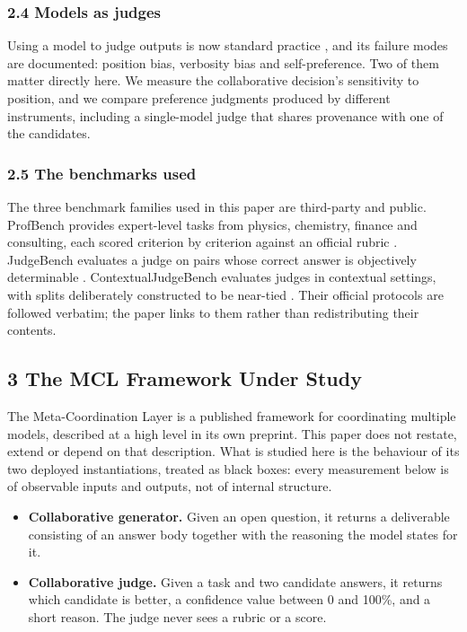 \documentclass[
]{article}
\providecommand{\tightlist}{%
  \setlength{\itemsep}{0pt}\setlength{\parskip}{0pt}}
\begin{document}
\subsubsection{2.4 Models as judges}\label{llm-judge}

Using a model to judge outputs is now standard practice \cite{zheng2023judging}, and its
failure modes are documented: position bias, verbosity bias and self-preference. Two of
them matter directly here. We measure the collaborative decision's sensitivity to position,
and we compare preference judgments produced by different instruments, including a
single-model judge that shares provenance with one of the candidates.

\subsubsection{2.5 The benchmarks used}\label{benchmarks-related}

The three benchmark families used in this paper are third-party and public. ProfBench
provides expert-level tasks from physics, chemistry, finance and consulting, each scored
criterion by criterion against an official rubric \cite{nvidia2026profbench}. JudgeBench
evaluates a judge on pairs whose correct answer is objectively determinable
\cite{judgebench2024}. ContextualJudgeBench evaluates judges in contextual settings, with
splits deliberately constructed to be near-tied \cite{cjb2025}. Their official protocols
are followed verbatim; the paper links to them rather than redistributing their contents.

\subsection{3 The MCL Framework Under Study}\label{framework}

The Meta-Coordination Layer is a published framework for coordinating multiple models,
described at a high level in its own preprint. This paper does not restate, extend or
depend on that description. What is studied here is the behaviour of its two deployed
instantiations, treated as black boxes: every measurement below is of observable inputs
and outputs, not of internal structure.

\begin{itemize}
\tightlist
\item
  \textbf{Collaborative generator.} Given an open question, it returns a deliverable
  consisting of an answer body together with the reasoning the model states for it.
\item
  \textbf{Collaborative judge.} Given a task and two candidate answers, it returns
  which candidate is better, a confidence value between 0 and 100\%, and a short
  reason. The judge never sees a rubric or a score.
\end{itemize}
\end{document}
